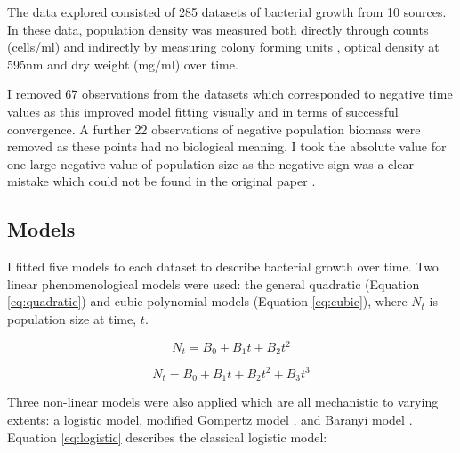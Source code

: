 \documentclass[11pt]{article}
\begin{document}
\begin{linenumbers}
            The data explored consisted of 285 datasets of bacterial growth from 10 sources. In these data, population density was measured both directly through counts (cells/ml) \citep{phillips_relation_1987, gill_growth_1991, zwietering_modeling_1994, bernhardt_metabolic_2018,  silva_modelling_2018} and indirectly by measuring colony forming units \citep{stannard_temperaturegrowth_1985, roth_continuity_1962, galarz_predicting_2016}, optical density at 595nm \citep{bae_growth_2014} and dry weight (mg/ml) \citep{sivonen_effects_1990} over time.
            
            I removed 67 observations from the datasets which corresponded to negative time values as this improved model fitting visually and in terms of successful convergence. A further 22 observations of negative population biomass were removed as these points had no biological meaning. I took the absolute value for one large negative value of population size as the negative sign was a clear mistake which could not be found in the original paper \citep{bernhardt_metabolic_2018}.


        \subsection{Models}
        
            I fitted five models to each dataset to describe bacterial growth over time. Two linear phenomenological models were used: the general quadratic (Equation \ref{eq:quadratic}) and cubic polynomial models (Equation \ref{eq:cubic}), where $N_t$ is population size at time, $t$. 
            
            \begin{equation}
                N_t = B_0 + B_1 t + B_2 t^2
                \label{eq:quadratic}
            \end{equation}
            
            \begin{equation}
                N_t = B_0 + B_1 t + B_2 t^2 + B_3 t^3
                \label{eq:cubic}
            \end{equation}
            
            Three non-linear models were also applied which are all mechanistic to varying extents: a logistic model, modified Gompertz model \citep{zwietering_modeling_1990}, and Baranyi model \citep{baranyi_dynamic_1994, grijspeerdt_estimating_1999}. Equation \ref{eq:logistic} describes the classical logistic model:
            

\end{linenumbers}
\end{document}
